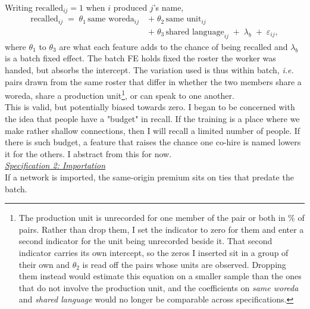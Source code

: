 \noindent Writing $\text{recalled}_{ij}=1$ when $i$ produced $j$'s name,
\begin{equation}
\label{eq:strategy-recall}
\begin{split}
\text{recalled}_{ij} \;=\; \theta_1\,\text{same woreda}_{ij} \;&+\; \theta_2\,\text{same unit}_{ij} \\
&+\; \theta_3\,\text{shared language}_{ij} \;+\; \lambda_{b} \;+\; \varepsilon_{ij},
\end{split}
\end{equation}
where $\theta_1$ to $\theta_3$ are what each feature adds to the chance of being recalled and $\lambda_b$ is a batch fixed effect. The batch FE holds fixed the roster the worker was handed, but absorbs the intercept. The variation used is thus within batch, \textit{i.e.} pairs drawn from the same roster that differ in whether the two members share a woreda, share a production unit\footnote{\noindent The production unit is unrecorded for one member of the pair or both in \pnPuUnknownPct{}\% of pairs. Rather than drop them, I set the indicator to
zero for them and enter a second indicator for the unit being unrecorded beside it. That second indicator carries its own intercept, so the zeros I inserted sit in a group of their own and $\theta_2$ is read off the pairs whose units are observed. Dropping them instead would estimate this equation on a smaller sample than the ones that do not involve the production unit, and the coefficients on \textit{same woreda} and \textit{shared language} would no longer be comparable across specifications. }, or can speak to one another. \\

\noindent This is valid, but potentially biased towards zero. I began to be concerned with the idea that people have a "budget" in recall. If the training is a place where we make rather shallow connections, then I will recall a limited number of people. If there is such budget, a feature that raises the chance one co-hire is named lowers it for the others. I abstract from this for now. \\

\noindent \underline{\textit{Specification 2: Importation}} \\[0.4em]
If a network is imported, the same-origin premium sits on ties that predate the batch.\\


